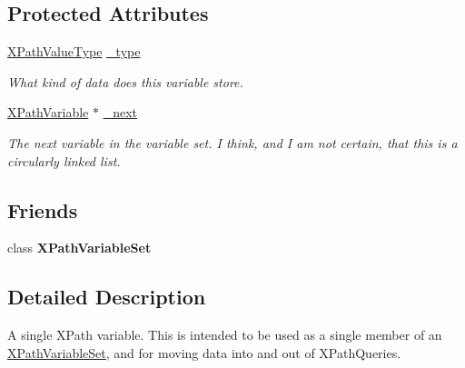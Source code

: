 \subsection*{Protected Attributes}
\begin{DoxyCompactItemize}
\item 
\hypertarget{classphys_1_1xml_1_1XPathVariable_a8841d47677912f4b88743928cf931eac}{
\hyperlink{namespacephys_1_1xml_a339b9eef674ba44100110e5524bc575d}{XPathValueType} \hyperlink{classphys_1_1xml_1_1XPathVariable_a8841d47677912f4b88743928cf931eac}{\_\-type}}
\label{df/dee/classphys_1_1xml_1_1XPathVariable_a8841d47677912f4b88743928cf931eac}

\begin{DoxyCompactList}\small\item\em What kind of data does this variable store. \item\end{DoxyCompactList}\item 
\hypertarget{classphys_1_1xml_1_1XPathVariable_abe57b58f8b6d2622d5e1ae93bc5361a3}{
\hyperlink{classphys_1_1xml_1_1XPathVariable}{XPathVariable} $\ast$ \hyperlink{classphys_1_1xml_1_1XPathVariable_abe57b58f8b6d2622d5e1ae93bc5361a3}{\_\-next}}
\label{df/dee/classphys_1_1xml_1_1XPathVariable_abe57b58f8b6d2622d5e1ae93bc5361a3}

\begin{DoxyCompactList}\small\item\em The next variable in the variable set. I think, and I am not certain, that this is a circularly linked list. \item\end{DoxyCompactList}\end{DoxyCompactItemize}
\subsection*{Friends}
\begin{DoxyCompactItemize}
\item 
\hypertarget{classphys_1_1xml_1_1XPathVariable_a6d8e28205e67fa0164160dd3cb547fe6}{
class {\bfseries XPathVariableSet}}
\label{df/dee/classphys_1_1xml_1_1XPathVariable_a6d8e28205e67fa0164160dd3cb547fe6}

\end{DoxyCompactItemize}


\subsection{Detailed Description}
A single XPath variable. This is intended to be used as a single member of an \hyperlink{classphys_1_1xml_1_1XPathVariableSet}{XPathVariableSet}, and for moving data into and out of XPathQueries. 

